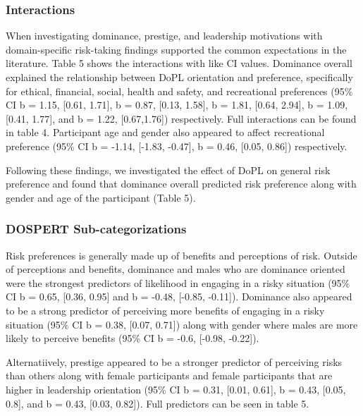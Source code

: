 \documentclass[
  donotrepeattitle,doc, 12pt, a4paper,floatsintext]{apa7}
\begin{document}
\hypertarget{interactions-1}{%
\subsubsection{Interactions}\label{interactions-1}}

When investigating dominance, prestige, and leadership motivations with domain-specific risk-taking findings supported the common expectations in the literature. Table 5 shows the interactions with like CI values. Dominance overall explained the relationship between DoPL orientation and preference, specifically for ethical, financial, social, health and safety, and recreational preferences (95\% CI b = 1.15, {[}0.61, 1.71{]}, b = 0.87, {[}0.13, 1.58{]}, b = 1.81, {[}0.64, 2.94{]}, b = 1.09, {[}0.41, 1.77{]}, and b = 1.22, {[}0.67,1.76{]}) respectively. Full interactions can be found in table 4. Participant age and gender also appeared to affect recreational preference (95\% CI b = -1.14, {[}-1.83, -0.47{]}, b = 0.46, {[}0.05, 0.86{]}) respectively.

Following these findings, we investigated the effect of DoPL on general risk preference and found that dominance overall predicted risk preference along with gender and age of the participant (Table 5).

\hypertarget{dospert-sub-categorizations}{%
\subsubsection{DOSPERT Sub-categorizations}\label{dospert-sub-categorizations}}

Risk preferences is generally made up of benefits and perceptions of risk. Outside of perceptions and benefits, dominance and males who are dominance oriented were the strongest predictors of likelihood in engaging in a risky situation (95\% CI b = 0.65, {[}0.36, 0.95{]} and b = -0.48, {[}-0.85, -0.11{]}). Dominance also appeared to be a strong predictor of perceiving more benefits of engaging in a risky situation (95\% CI b = 0.38, {[}0.07, 0.71{]}) along with gender where males are more likely to perceive benefits (95\% CI b = -0.6, {[}-0.98, -0.22{]}).

Alternatiively, prestige appeared to be a stronger predictor of perceiving risks than others along with female participants and female participants that are higher in leadership orientation (95\% CI b = 0.31, {[}0.01, 0.61{]}, b = 0.43, {[}0.05, 0.8{]}, and b = 0.43, {[}0.03, 0.82{]}). Full predictors can be seen in table 5.
\end{document}
